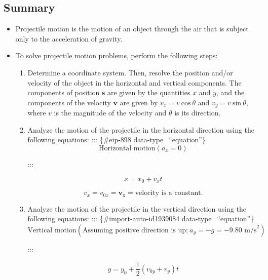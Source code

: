 \documentclass[
]{book}
\begin{document}
\hypertarget{fs-id1843457-summary}{}
\hypertarget{summary-3}{%
\subsection{Summary}\label{summary-3}}

\begin{itemize}
\item
  \protect\hypertarget{import-auto-id1677012}{}{Projectile motion is the motion of an object through the air that
  is subject only to the acceleration of
  gravity.}
\item
  \protect\hypertarget{import-auto-id1786765}{}{To solve projectile motion problems, perform the following
  steps:}

  \begin{enumerate}
  \def\labelenumi{\arabic{enumi}.}
  \item
    \protect\hypertarget{import-auto-id1830314}{}{Determine a coordinate system. Then, resolve the position
    and/or velocity of the object in the horizontal and vertical
    components. The components of position \(\mathbf{s}{}\) are given
    by the quantities \(x{}\) and \(y{}\), and the components of the
    velocity \(\mathbf{v}{}\) are given by
    \({{v_{x} = v}\ \text{cos}\ \theta}{}\) and
    \({{v_{y} = v}\ \text{sin}\ \theta}{}\), where \(v{}\) is the
    magnitude of the velocity and \(\theta{}\) is its
    direction.}
  \item
    \protect\hypertarget{import-auto-id1830316}{}{Analyze the motion of the projectile in the horizontal
    direction using the following
    equations:}
    ::: \{\#eip-898 data-type=``equation''\}
    \[{\text{Horizontal\ motion}({a_{x} = 0})}{}\]

    :::

    \leavevmode\hypertarget{eip-236}{}%
    \[{{x = {x_{0} + v_{x}}}t}{}\]

    \leavevmode\hypertarget{eip-612}{}%
    \[{{{v_{x} = v_{0x}} = \textbf{v}_{\text{x}}} = \text{velocity\ is\ a\ constant.}}{}\]
  \item
    \protect\hypertarget{import-auto-id1939082}{}{Analyze the motion of the projectile in the vertical direction
    using the following equations:}
    ::: \{\#import-auto-id1939084 data-type=``equation''\}
    \[{\text{Vertical\ motion}(\text{Assuming\ positive\ direction\ is\ up;}\ {{a_{y} = {- g}} = {- 9}}\text{.}\text{80\ m}\text{/s}^{2})}{}\]

    :::

    \leavevmode\hypertarget{import-auto-id1492830}{}%
    \[{{y = {y_{0} + \frac{1}{2}}}({v_{0y} + v_{y}})t}{}\]


\end{enumerate}
\end{itemize}
\end{document}
